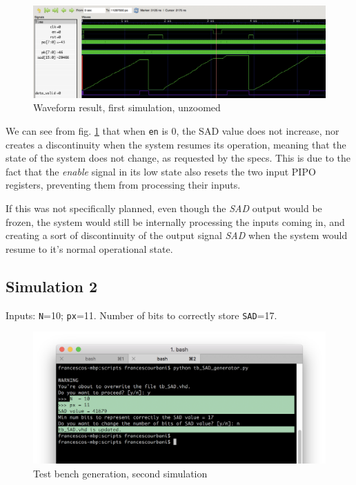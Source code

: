 \documentclass[12pt, a4paper]{article}
\begin{document}
\begin{figure}[h!]
\includegraphics[scale=0.18]{../screenshots/gtkwave/sim1_gtkwave2.png}
\caption{Waveform result, first simulation, unzoomed}\label{fig:wave2}
\end{figure}


We can see from fig. \ref{fig:wave2} that when \texttt{en} is 0, the SAD value does not increase, nor creates a discontinuity when the system resumes its operation, meaning that the state of the system does not change, as requested by the specs. 
This is due to the fact that the \textit{enable} signal in its low state also resets the two input PIPO registers, preventing them from processing their inputs.

If this was not specifically planned, even though the \textit{SAD} output would be frozen, the system would still be internally processing the inputs coming in, and creating a sort of discontinuity of the output signal \textit{SAD} when the system would resume to it's normal operational state.





\subsection{Simulation 2}

Inputs: \texttt{N}=10; \texttt{px}=11. Number of bits to correctly store \texttt{SAD}=17.

\begin{figure}[h!]
\includegraphics[scale=0.5]{../screenshots/gtkwave/sim2_term.png}
\caption{Test bench generation, second simulation}\label{fig:term2}
\end{figure}
\end{document}
